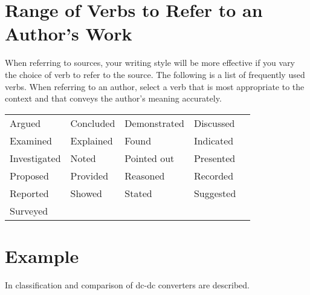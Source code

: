 \section{Range of Verbs to Refer to an Author's Work}
When referring to sources, your writing style will be more effective if you vary the 
choice of verb to refer to the source. The following is a list of frequently used verbs. 
When referring to an author, select a verb that is most appropriate to the context and 
that conveys the author's meaning accurately.
\begin{table}[!ht]
\begin{tabular}{lllll}
Argued & Concluded & Demonstrated & Discussed \\
Examined & Explained & Found & Indicated \\
Investigated & Noted & Pointed out & Presented\\
Proposed & Provided & Reasoned & Recorded \\
Reported & Showed & Stated & Suggested \\
Surveyed & & &  
\end{tabular}
\end{table}

\section{Example}
In \cite{a1} classification and comparison 
of dc-dc converters are described.







